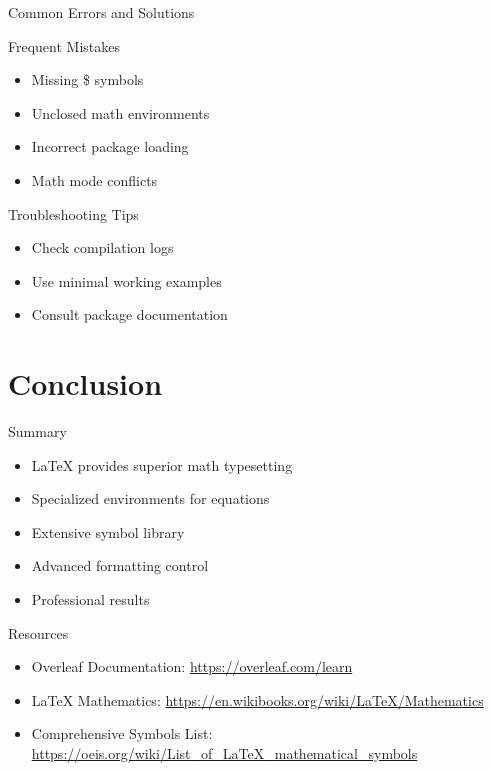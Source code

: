 \documentclass{beamer}
\begin{document}
\begin{frame}{Common Errors and Solutions}
\begin{alertblock}{Frequent Mistakes}
\begin{itemize}
\item Missing \$ symbols
\item Unclosed math environments
\item Incorrect package loading
\item Math mode conflicts
\end{itemize}
\end{alertblock}

\begin{block}{Troubleshooting Tips}
\begin{itemize}
\item Check compilation logs
\item Use minimal working examples
\item Consult package documentation
\end{itemize}
\end{block}
\end{frame}

\section{Conclusion}
\begin{frame}{Summary}
\begin{itemize}
\item LaTeX provides superior math typesetting
\item Specialized environments for equations
\item Extensive symbol library
\item Advanced formatting control
\item Professional results
\end{itemize}
\end{frame}

\begin{frame}{Resources}
\begin{itemize}
\item Overleaf Documentation: \url{https://overleaf.com/learn}
\item LaTeX Mathematics: \url{https://en.wikibooks.org/wiki/LaTeX/Mathematics}
\item Comprehensive Symbols List: \url{https://oeis.org/wiki/List_of_LaTeX_mathematical_symbols}
\end{itemize}
\end{frame}
\end{document}
